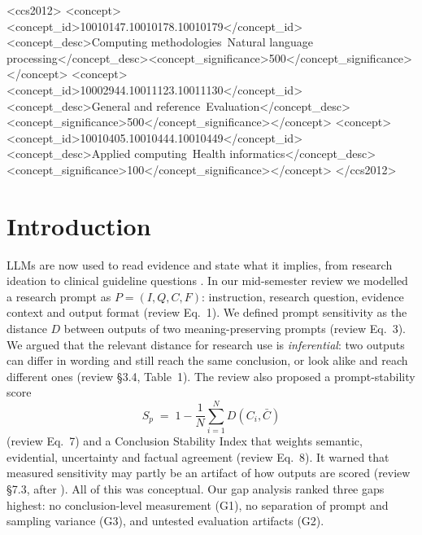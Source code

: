\documentclass[acmsmall]{acmart}
\begin{document}
\begin{CCSXML}
<ccs2012>
<concept><concept_id>10010147.10010178.10010179</concept_id><concept_desc>Computing methodologies~Natural language processing</concept_desc><concept_significance>500</concept_significance></concept>
<concept><concept_id>10002944.10011123.10011130</concept_id><concept_desc>General and reference~Evaluation</concept_desc><concept_significance>500</concept_significance></concept>
<concept><concept_id>10010405.10010444.10010449</concept_id><concept_desc>Applied computing~Health informatics</concept_desc><concept_significance>100</concept_significance></concept>
</ccs2012>
\end{CCSXML}


\maketitle

\section{Introduction}\label{sec:intro}
LLMs are now used to read evidence and state what it implies, from research ideation to clinical guideline questions \cite{si2025ideas,wang2024guideline}. In our mid-semester review \cite{joshi2026review} we modelled a research prompt as $P=(I,Q,C,F)$: instruction, research question, evidence context and output format (review Eq.~1). We defined prompt sensitivity as the distance $D$ between outputs of two meaning-preserving prompts (review Eq.~3). We argued that the relevant distance for research use is \emph{inferential}: two outputs can differ in wording and still reach the same conclusion, or look alike and reach different ones (review \S3.4, Table~1). The review also proposed a prompt-stability score
\begin{equation}\label{eq:sp}
S_p \;=\; 1-\frac{1}{N}\sum_{i=1}^{N} D\!\left(C_i,\bar C\right)
\end{equation}
(review Eq.~7) and a Conclusion Stability Index that weights semantic, evidential, uncertainty and factual agreement (review Eq.~8). It warned that measured sensitivity may partly be an artifact of how outputs are scored (review \S7.3, after \cite{hua2025flaw}). All of this was conceptual. Our gap analysis ranked three gaps highest: no conclusion-level measurement (G1), no separation of prompt and sampling variance (G3), and untested evaluation artifacts (G2).
\end{document}
